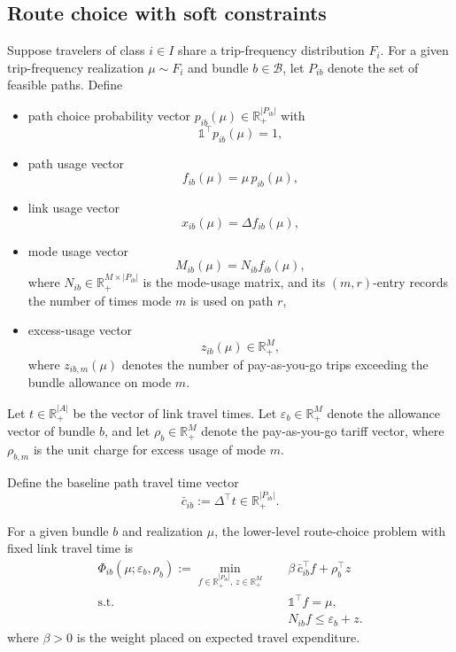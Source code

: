 \documentclass{article}
\newcommand{\setB}{\mathcal{B}}
\newcommand{\mbbone}{\mathbb{1}}
\begin{document}
\subsection{Route choice with soft constraints}
Suppose travelers of class $i\in I$ share a trip-frequency distribution $F_i$.
For a given trip-frequency realization $\mu\sim F_i$ and bundle $b\in\setB$,
let $P_{ib}$ denote the set of feasible paths. Define
\begin{itemize}
    \item path choice probability vector $p_{ib}(\mu)\in\mathbb{R}_+^{|P_{ib}|}$ with
    \[
    \mbbone^\top p_{ib}(\mu)=1,
    \]
    \item path usage vector
    \[
    f_{ib}(\mu)=\mu\,p_{ib}(\mu),
    \]
    \item link usage vector
    \[
    x_{ib}(\mu)=\Delta f_{ib}(\mu),
    \]
    \item mode usage vector
    \[
    M_{ib}(\mu)=N_{ib}f_{ib}(\mu),
    \]
    where $N_{ib}\in\mathbb{R}_+^{M\times |P_{ib}|}$ is the mode-usage matrix, and
    its $(m,r)$-entry records the number of times mode $m$ is used on path $r$,
    \item excess-usage vector
    \[
    z_{ib}(\mu)\in\mathbb{R}_+^M,
    \]
    where $z_{ib,m}(\mu)$ denotes the number of pay-as-you-go trips exceeding the
    bundle allowance on mode $m$.
\end{itemize}

Let $t\in\mathbb{R}_+^{|A|}$ be the vector of link travel times. Let $\varepsilon_b\in\mathbb{R}_+^M$ denote the allowance vector of bundle $b$, and
let $\rho_b\in\mathbb{R}_+^M$ denote the pay-as-you-go tariff vector, where
$\rho_{b,m}$ is the unit charge for excess usage of mode $m$.

Define the baseline path travel time vector
\[
\bar c_{ib}:=\Delta^\top t\in\mathbb{R}_+^{|P_{ib}|}.
\]

For a given bundle $b$ and realization $\mu$, the lower-level route-choice problem with fixed link travel time is
\begin{align}
\Phi_{ib}(\mu;\varepsilon_b,\rho_b):=
\min_{f\in\mathbb{R}_+^{|P_{ib}|},\,z\in\mathbb{R}_+^M}
\quad & \beta\,\bar c_{ib}^\top f+\rho_b^\top z
\label{eq:payg-primal-obj}\\
\text{s.t.}\quad
& \mbbone^\top f=\mu,
\label{eq:payg-primal-demand}\\
& N_{ib}f\le \varepsilon_b+z.
\label{eq:payg-primal-allowance}
\end{align}
where $\beta>0$ is the weight placed on expected
travel expenditure.
\end{document}
